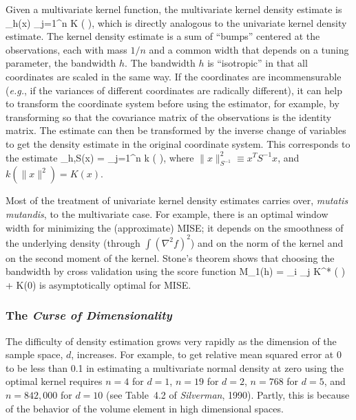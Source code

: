 Given a multivariate kernel function, the multivariate kernel density estimate is
\beq
    _h(x) \equiv {} \sum_{j=1}^n K \left (  \right ),
\eeq
which is directly analogous to the univariate kernel density estimate.
The kernel density estimate is a sum of ``bumps'' centered at the observations,
each with mass $1/n$ and a common width that depends on a tuning parameter, the
bandwidth $h$.
The bandwidth $h$ is ``isotropic'' in that all coordinates are scaled in the
same way.
If the coordinates are incommensurable ({\em e.g.\/}, if the variances of different
coordinates are radically different), it can help to transform the coordinate system
before using the estimator, for example, by transforming so that the covariance
matrix of the observations is the identity matrix.
The estimate can then be transformed by the inverse change of variables to get
the density estimate in the original coordinate system.
This corresponds to the estimate
\beq
    _{h,S}(x) =  \sum_{j=1}^n
        k \left (  \right ),
\eeq
where $\|x\|_{S^{-1}}^2 \equiv x^T S^{-1} x$, and $k(\|x\|^2) = K(x)$.

Most of the treatment of univariate kernel density estimates carries over,
{\em mutatis mutandis\/}, to the multivariate case.
For example, there is an optimal window width for minimizing the (approximate) MISE;
it depends on the smoothness of the underlying density (through $\int (\nabla^2 f)^2$)
and on the norm of the kernel and on the second moment of the kernel.
Stone's theorem shows that choosing the bandwidth by cross validation using the
score function
\beq
    M_1(h) =  \sum_i \sum_j K^* \left (  \right )
    + K(0)
\eeq
is asymptotically optimal for MISE.

\subsubsection{The {\em Curse of Dimensionality\/}}
The difficulty of density estimation grows very rapidly as the dimension of the
sample space, $d$, increases.
For example, to get relative mean squared error at 0 to be less than 0.1
in estimating a multivariate normal density at zero using the optimal
kernel requires $n = 4$ for $d=1$, $n=19$ for $d=2$,
$n=768$ for $d=5$, and $n = 842,000$ for $d=10$
(see Table~4.2 of {\em Silverman\/}, 1990).
Partly, this is because of the behavior of the volume element in high dimensional
spaces.


